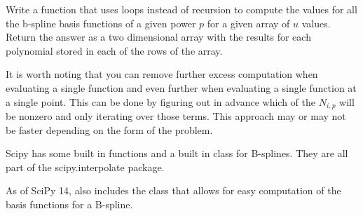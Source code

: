 \begin{problem}
Write a function that uses loops instead of recursion to compute the values for all the b-spline basis functions of a given power $p$ for a given array of $u$ values.
Return the answer as a two dimensional array with the results for each polynomial stored in each of the rows of the array.
\end{problem}

It is worth noting that you can remove further excess computation when evaluating a single function and even further when evaluating a single function at a single point.
This can be done by figuring out in advance which of the $N_{i,p}$ will be nonzero and only iterating over those terms.
This approach may or may not be faster depending on the form of the problem.

Scipy has some built in functions and a built in class for B-splines.
They are all part of the scipy.interpolate package.

As of SciPy 14,  also includes the  class that allows for easy computation of the basis functions for a B-spline.
